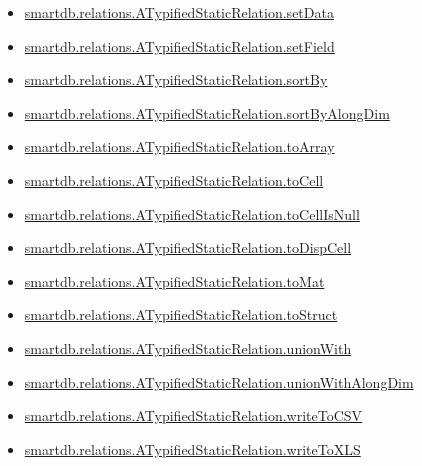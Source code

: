 \documentclass[letterpaper,10pt,english]{sphinxmanual}
\begin{document}
\begin{itemize}
\item {} 
{\hyperref[chap_functions:smartdb-relations-atypifiedstaticrelation-setdata]{smartdb.relations.ATypifiedStaticRelation.setData}}

\item {} 
{\hyperref[chap_functions:smartdb-relations-atypifiedstaticrelation-setfield]{smartdb.relations.ATypifiedStaticRelation.setField}}

\item {} 
{\hyperref[chap_functions:smartdb-relations-atypifiedstaticrelation-sortby]{smartdb.relations.ATypifiedStaticRelation.sortBy}}

\item {} 
{\hyperref[chap_functions:smartdb-relations-atypifiedstaticrelation-sortbyalongdim]{smartdb.relations.ATypifiedStaticRelation.sortByAlongDim}}

\item {} 
{\hyperref[chap_functions:smartdb-relations-atypifiedstaticrelation-toarray]{smartdb.relations.ATypifiedStaticRelation.toArray}}

\item {} 
{\hyperref[chap_functions:smartdb-relations-atypifiedstaticrelation-tocell]{smartdb.relations.ATypifiedStaticRelation.toCell}}

\item {} 
{\hyperref[chap_functions:smartdb-relations-atypifiedstaticrelation-tocellisnull]{smartdb.relations.ATypifiedStaticRelation.toCellIsNull}}

\item {} 
{\hyperref[chap_functions:smartdb-relations-atypifiedstaticrelation-todispcell]{smartdb.relations.ATypifiedStaticRelation.toDispCell}}

\item {} 
{\hyperref[chap_functions:smartdb-relations-atypifiedstaticrelation-tomat]{smartdb.relations.ATypifiedStaticRelation.toMat}}

\item {} 
{\hyperref[chap_functions:smartdb-relations-atypifiedstaticrelation-tostruct]{smartdb.relations.ATypifiedStaticRelation.toStruct}}

\item {} 
{\hyperref[chap_functions:smartdb-relations-atypifiedstaticrelation-unionwith]{smartdb.relations.ATypifiedStaticRelation.unionWith}}

\item {} 
{\hyperref[chap_functions:smartdb-relations-atypifiedstaticrelation-unionwithalongdim]{smartdb.relations.ATypifiedStaticRelation.unionWithAlongDim}}

\item {} 
{\hyperref[chap_functions:smartdb-relations-atypifiedstaticrelation-writetocsv]{smartdb.relations.ATypifiedStaticRelation.writeToCSV}}

\item {} 
{\hyperref[chap_functions:smartdb-relations-atypifiedstaticrelation-writetoxls]{smartdb.relations.ATypifiedStaticRelation.writeToXLS}}

\end{itemize}
\end{document}
